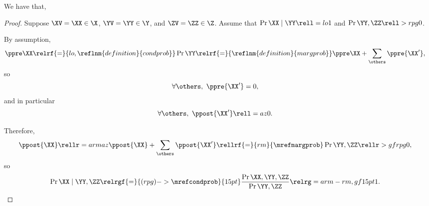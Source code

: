 \begin{proposition}
  We have that, %
\end{proposition}

\begin{proof}
  Suppose 
  $\XV = \XX \in \X$,
  $\YV = \YY \in \Y$, and
  $\ZV = \ZZ \in \Z$. Assume that $\Pr{\XX \mid \YY} \rell = lo 1$ and $\Pr{\YY, \ZZ} \rell > rpg 0$.

  By assumption,
  $$\ppre\XX \relrf{=}{lo,\reflnm{definition}{condprob}} \Pr{\YY} 
  \relrf{=}{\reflnm{definition}{margprob}} \ppre\XX + \sum_{\others}\ppre{\XX'},$$
    so
    $$\forall \others,\ \ppre{\XX'} = 0,$$
  and in particular
  $$\forall \others,\ \ppost{\XX'} \rell = az 0.$$

  Therefore, $$\ppost{\XX} \rellr = arm az \ppost{\XX} + \sum_{\others}\ppost{\XX'} 
  \rellrf{=}{rm}{\mrefmargprob} \Pr{\YY, \ZZ} \rellr > gf rpg 0,$$
  so $$\Pr{\XX \mid \YY, \ZZ} 
  \relrgf{=}{(rpg)->\mrefcondprob}{15pt} \frac{\Pr{\XX, \YY, \ZZ}}{\Pr{\YY, \ZZ}} 
  \relrg = arm-rm,gf 15pt 1.$$%
\end{proof}
